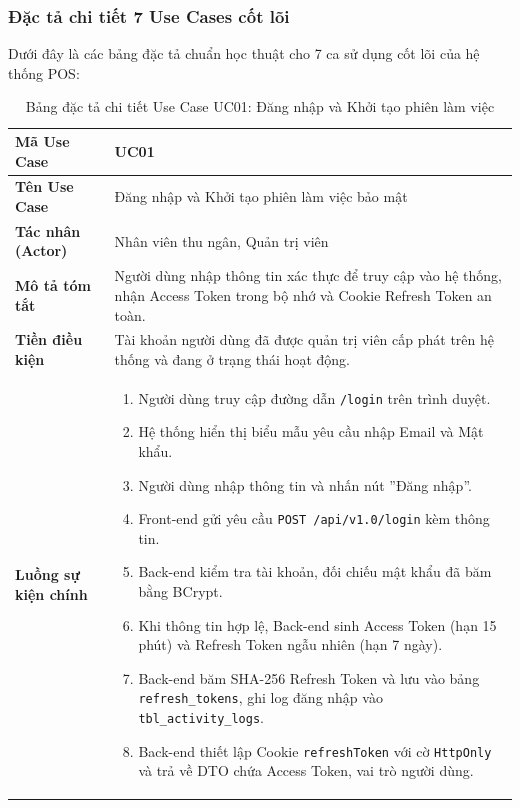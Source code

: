 \subsubsection{Đặc tả chi tiết 7 Use Cases cốt lõi}

Dưới đây là các bảng đặc tả chuẩn học thuật cho 7 ca sử dụng cốt lõi của hệ thống POS:

\begin{table}[htbp]
\centering
\caption{Bảng đặc tả chi tiết Use Case UC01: Đăng nhập và Khởi tạo phiên làm việc}
\label{tab:uc01_login}
\vspace{2mm}
\begin{tabularx}{\textwidth}{|l|X|}
\hline
\textbf{Mã Use Case} & \textbf{UC01} \\ \hline
\textbf{Tên Use Case} & Đăng nhập và Khởi tạo phiên làm việc bảo mật \\ \hline
\textbf{Tác nhân (Actor)} & Nhân viên thu ngân, Quản trị viên \\ \hline
\textbf{Mô tả tóm tắt} & Người dùng nhập thông tin xác thực để truy cập vào hệ thống, nhận Access Token trong bộ nhớ và Cookie Refresh Token an toàn. \\ \hline
\textbf{Tiền điều kiện} & Tài khoản người dùng đã được quản trị viên cấp phát trên hệ thống và đang ở trạng thái hoạt động. \\ \hline
\textbf{Luồng sự kiện chính} & 
\begin{enumerate}[leftmargin=*, nosep]
    \item Người dùng truy cập đường dẫn \texttt{/login} trên trình duyệt.
    \item Hệ thống hiển thị biểu mẫu yêu cầu nhập Email và Mật khẩu.
    \item Người dùng nhập thông tin và nhấn nút ''Đăng nhập''.
    \item Front-end gửi yêu cầu \texttt{POST /api/v1.0/login} kèm thông tin.
    \item Back-end kiểm tra tài khoản, đối chiếu mật khẩu đã băm bằng BCrypt.
    \item Khi thông tin hợp lệ, Back-end sinh Access Token (hạn 15 phút) và Refresh Token ngẫu nhiên (hạn 7 ngày).
    \item Back-end băm SHA-256 Refresh Token và lưu vào bảng \texttt{refresh\_tokens}, ghi log đăng nhập vào \texttt{tbl\_activity\_logs}.
    \item Back-end thiết lập Cookie \texttt{refreshToken} với cờ \texttt{HttpOnly} và trả về DTO chứa Access Token, vai trò người dùng.

\end{enumerate}
\end{tabularx}
\end{table}
